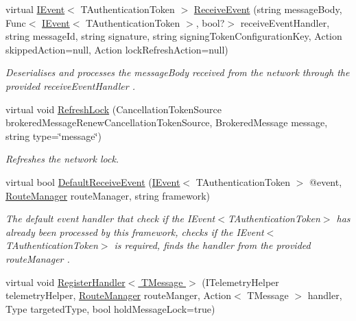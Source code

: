 \begin{DoxyCompactItemize}
virtual \hyperlink{interfaceCqrs_1_1Events_1_1IEvent}{I\+Event}$<$ T\+Authentication\+Token $>$ \hyperlink{classCqrs_1_1Azure_1_1ServiceBus_1_1AzureBusHelper_ab1feda11b64b606f36d517ce5ce8ca59_ab1feda11b64b606f36d517ce5ce8ca59}{Receive\+Event} (string message\+Body, Func$<$ \hyperlink{interfaceCqrs_1_1Events_1_1IEvent}{I\+Event}$<$ T\+Authentication\+Token $>$, bool?$>$ receive\+Event\+Handler, string message\+Id, string signature, string signing\+Token\+Configuration\+Key, Action skipped\+Action=null, Action lock\+Refresh\+Action=null)
\begin{DoxyCompactList}\small\item\em Deserialises and processes the {\itshape message\+Body}  received from the network through the provided {\itshape receive\+Event\+Handler} . \end{DoxyCompactList}\item 
virtual void \hyperlink{classCqrs_1_1Azure_1_1ServiceBus_1_1AzureBusHelper_aa4ef095148aae1af508fcd7b51f538d3_aa4ef095148aae1af508fcd7b51f538d3}{Refresh\+Lock} (Cancellation\+Token\+Source brokered\+Message\+Renew\+Cancellation\+Token\+Source, Brokered\+Message message, string type=\char`\"{}message\char`\"{})
\begin{DoxyCompactList}\small\item\em Refreshes the network lock. \end{DoxyCompactList}\item 
virtual bool \hyperlink{classCqrs_1_1Azure_1_1ServiceBus_1_1AzureBusHelper_a0139f99e393214427b9a711bf27cae40_a0139f99e393214427b9a711bf27cae40}{Default\+Receive\+Event} (\hyperlink{interfaceCqrs_1_1Events_1_1IEvent}{I\+Event}$<$ T\+Authentication\+Token $>$ @event, \hyperlink{classCqrs_1_1Bus_1_1RouteManager}{Route\+Manager} route\+Manager, string framework)
\begin{DoxyCompactList}\small\item\em The default event handler that check if the I\+Event$<$\+T\+Authentication\+Token$>$ has already been processed by this framework, checks if the I\+Event$<$\+T\+Authentication\+Token$>$ is required, finds the handler from the provided {\itshape route\+Manager} . \end{DoxyCompactList}\item 
virtual void \hyperlink{classCqrs_1_1Azure_1_1ServiceBus_1_1AzureBusHelper_a3b8dd8410756ffdc67782dde8f2519ff_a3b8dd8410756ffdc67782dde8f2519ff}{Register\+Handler$<$ T\+Message $>$} (I\+Telemetry\+Helper telemetry\+Helper, \hyperlink{classCqrs_1_1Bus_1_1RouteManager}{Route\+Manager} route\+Manger, Action$<$ T\+Message $>$ handler, Type targeted\+Type, bool hold\+Message\+Lock=true)

\end{DoxyCompactItemize}
